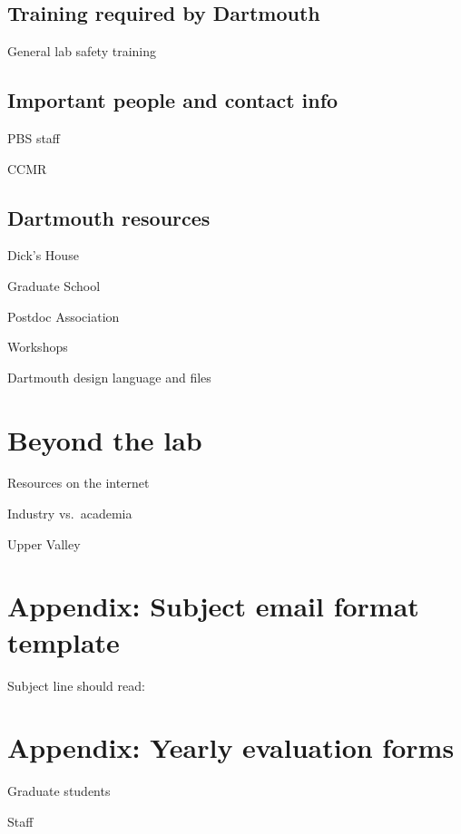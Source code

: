 \documentclass{tufte-book}
\begin{document}
\section{Training required by Dartmouth}

General lab safety training

\section{Important people and contact info}

PBS staff

CCMR 

\section{Dartmouth resources}

Dick's House

Graduate School

Postdoc Association

Workshops

Dartmouth design language and files

\chapter{Beyond the lab}

Resources on the internet

Industry vs.\ academia

Upper Valley



\chapter{Appendix: Subject email format template}

Subject line should read:

\chapter{Appendix: Yearly evaluation forms}

Graduate students

Staff

\backmatter





\printindex
\end{document}
